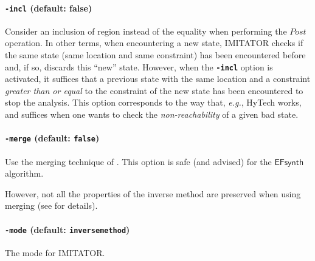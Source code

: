 \documentclass[a4paper,11pt]{report}
\makeatletter
\newcommand{\EFsynth}{\ensuremath{\mathsf{EFsynth}}}
\newcommand{\hytech}{{\sc HyTech}}
\newcommand{\imitator}{\textsf{IMITATOR}}
\newcommand{\code}[1]{\textbf{\texttt{#1}}}
\newcommand{\styleOption}[1]{\textcolor{optioncolor}{\texttt{#1}}}
\newcommand{\eg}{\textcolor{colorok}{\textit{e.g.},\@}}
\makeatother
\begin{document}
\paragraph{\styleOption{-incl} (default: false)}
Consider an inclusion of region instead of the equality when performing the $\textit{Post}$ operation.
In other terms, when encountering a new state, \imitator{} checks if the same state (same location and same constraint) has been encountered before and, if so, discards this ``new'' state.
However, when the \code{-incl} option is activated, it suffices that a previous state with the same location and a constraint \emph{greater than or equal} to the constraint of the new state has been encountered to stop the analysis.
This option corresponds to the way that, \eg{} \hytech{} works, and suffices when one wants to check the \emph{non-reachability} of a given bad state.


\paragraph{\styleOption{-merge} (default: \code{false})}
Use the merging technique of \cite{AFS13atva}.
This option is safe (and advised) for the \EFsynth{} algorithm.

However, not all the properties of the inverse method are preserved when using merging (see \cite{AFS13atva} for details).



\paragraph{\styleOption{-mode} (default: \styleOption{inversemethod})}
The mode for \imitator{}.
\end{document}
